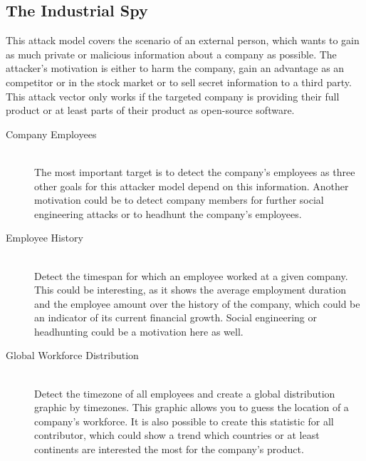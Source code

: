\subsection{The Industrial Spy}\label{industrial-spy}
This attack model covers the scenario of an external person, which wants to gain as much private or malicious information about a company as possible.
The attacker's motivation is either to harm the company, gain an advantage as an competitor or in the stock market or to sell secret information to a third party.
This attack vector only works if the targeted company is providing their full product or at least parts of their product as open-source software.

\begin{description}
    \item[Company Employees] \hfill \\
        The most important target is to detect the company's employees as three other goals for this attacker model depend on this information.
        Another motivation could be to detect company members for further social engineering attacks or to headhunt the company's employees.

    \item[Employee History] \hfill \\
        Detect the timespan for which an employee worked at a given company.
        This could be interesting, as it shows the average employment duration and the employee amount over the history of the company, which could be an indicator of its current financial growth.
        Social engineering or headhunting could be a motivation here as well.

    \item[Global Workforce Distribution] \hfill \\
        Detect the timezone of all employees and create a global distribution graphic by timezones.
        This graphic allows you to guess the location of a company's workforce.
        It is also possible to create this statistic for all contributor, which could show a trend which countries or at least continents are interested the most for the company's product.


\end{description}
